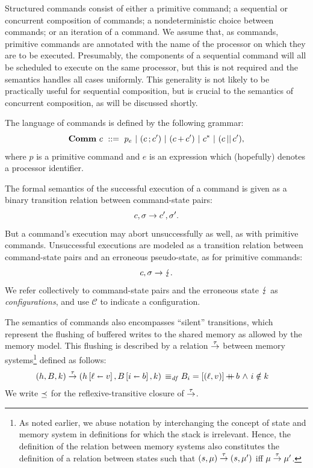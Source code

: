 \documentclass[11pt]{report}
\begin{document}
Structured commands consist of either a primitive command; a sequential or concurrent composition of commands; a nondeterministic choice between commands; or an iteration of a command. We assume that, as commands, primitive commands are annotated with the name of the processor on which they are to be executed. Presumably, the components of a sequential command will all be scheduled to execute on the same processor, but this is not required and the semantics handles all cases uniformly. This generality is not likely to be practically useful for sequential composition, but is crucial to the semantics of concurrent composition, as will be discussed shortly. 

The language of commands is defined by the following grammar: \[ \mathbf{Comm}~c ~::=~ p_e ~|~ (c \operatorname{;} c') ~|~ (c \operatorname{+} c') ~|~ c^{\operatorname{\ast}} ~|~ (c \operatorname{||} c'),\] where $p$ is a primitive command and $e$ is an expression which (hopefully) denotes a processor identifier.  

The formal semantics of the successful execution of a command is given as a binary transition relation between command-state pairs: \[ c,\sigma \rightarrow c',\sigma'.\] But a command's execution may abort unsuccessfully as well, as with primitive commands. Unsuccessful executions are modeled as a transition relation between command-state pairs and an erroneous pseudo-state, as for primitive commands: \[ c,\sigma \rightarrow \lightning. \] We refer collectively to command-state pairs and the erroneous state $\lightning$ as \emph{configurations}, and use $\mathcal{C}$ to indicate a configuration. 

The semantics of commands also encompasses ``silent'' transitions, which represent the flushing of buffered writes to the shared memory as allowed by the memory model. This flushing is described by a relation $\stackrel{\tau}{\rightarrow}$ between memory systems\footnote{As noted earlier, we abuse notation by interchanging the concept of state and memory system in definitions for which the stack is irrelevant. Hence, the definition of the relation between memory systems  also constitutes the definition of a relation between states such that $(s,\mu) \stackrel{\tau}{\rightarrow} (s,\mu')$ iff $\mu \stackrel{\tau}{\rightarrow} \mu'$.} defined as follows: \begin{align*} (h,B,k) \stackrel{\tau}{\rightarrow} (h \left[ \ell \shortleftarrow v \right],B \left[ i \shortleftarrow b \right],k) \operatorname{\;\equiv_{\mathit{df}}\;} & B_i = \left[(\ell,v)\right] \operatorname{+\!\!\!+} b \operatorname{\,\wedge\,} i \notin k 
\end{align*} We write $\preceq$ for the reflexive-transitive closure of $\stackrel{\tau}{\rightarrow}$. 
\end{document}
